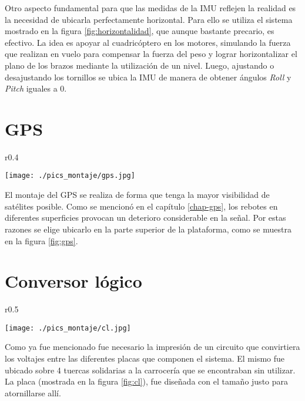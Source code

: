 \documentclass[main]{subfiles}
\begin{document}
Otro aspecto fundamental para que las medidas de la IMU reflejen la realidad es la necesidad de ubicarla perfectamente horizontal. Para ello se utiliza el sistema mostrado en la figura \ref{fig:horizontalidad}, que aunque bastante precario, es efectivo. La idea es apoyar al cuadricóptero en los motores, simulando la fuerza que realizan en vuelo para compensar la fuerza del peso y lograr horizontalizar el plano de los brazos mediante la utilización de un nivel. Luego, ajustando o desajustando los tornillos se ubica la IMU de manera de obtener ángulos \emph{Roll} y \emph{Pitch} iguales a $0$.

\section{GPS}

\begin{wrapfigure}{r}{0.4\textwidth}
	\begin{center}
	\vspace{-45pt}
		\texttt{[image: ./pics\_montaje/gps.jpg]}
	\end{center}
	\caption{Montaje del GPS}
	\vspace{-10pt}
	\label{fig:gps}
\end{wrapfigure}

El montaje del GPS se realiza de forma que tenga la mayor visibilidad de satélites posible. Como se mencionó en el capítulo \ref{chap-gps}, los rebotes en diferentes superficies provocan un deterioro considerable en la señal. Por estas razones se elige ubicarlo en la parte superior de la plataforma, como se muestra en la figura \ref{fig:gps}.

\vspace{25pt}

\section{Conversor lógico}

\begin{wrapfigure}{r}{0.5\textwidth}
	\begin{center}
	\vspace{-40pt}
		\texttt{[image: ./pics\_montaje/cl.jpg]}
	\end{center}
	\caption{Placa de conversores lógicos}
	\label{fig:cl}
\end{wrapfigure}

Como ya fue mencionado fue necesario la impresión de un circuito que convirtiera los voltajes entre las diferentes placas que componen el sistema. El mismo fue ubicado sobre 4 tuercas solidarias a la carrocería que se encontraban sin utilizar. La placa (mostrada en la figura \ref{fig:cl}), fue diseñada con el tamaño justo para atornillarse allí.
\end{document}
